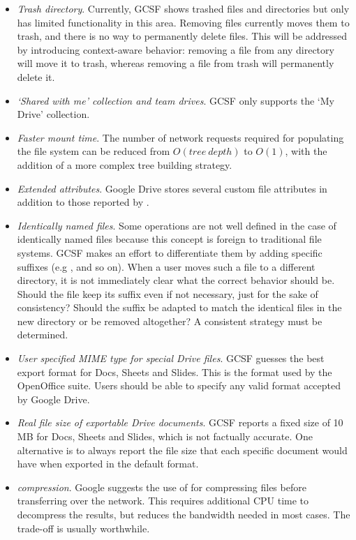\begin{itemize}
  \itemsep0em
  \item \emph{Trash directory}. Currently, GCSF shows trashed files and directories but only has limited functionality in this area. Removing files currently moves them to trash, and there is no way to permanently delete files. This will be addressed by introducing context-aware behavior: removing a file from any directory will move it to trash, whereas removing a file from trash will permanently delete it.
  \item \emph{`Shared with me' collection and team drives}. GCSF only supports the `My Drive' collection.
  \item \emph{Faster mount time}. The number of network requests required for populating the file system can be reduced from $ O(tree~depth) $ to $ O(1) $, with the addition of a more complex tree building strategy.
  \item \emph{Extended attributes}. Google Drive stores several custom file attributes in addition to those reported by .
  \item \emph{Identically named files}. Some operations are not well defined in the case of identically named files because this concept is foreign to traditional file systems. GCSF makes an effort to differentiate them by adding specific suffixes (e.g ,  and so on). When a user moves such a file to a different directory, it is not immediately clear what the correct behavior should be. Should the file keep its suffix even if not necessary, just for the sake of consistency? Should the suffix be adapted to match the identical files in the new directory or be removed altogether? A consistent strategy must be determined.
  \item \emph{User specified MIME type for special Drive files}. GCSF guesses the best export format for Docs, Sheets and Slides. This is the format used by the OpenOffice suite. Users should be able to specify any valid format accepted by Google Drive.
  \item \emph{Real file size of exportable Drive documents}. GCSF reports a fixed size of 10 MB for Docs, Sheets and Slides, which is not factually accurate. One alternative is to always report the file size that each specific document would have when exported in the default format.
  \item {} \emph{compression}. Google suggests the use of  for compressing files before transferring over the network. This requires additional CPU time to decompress the results, but reduces the bandwidth needed in most cases. The trade-off is usually worthwhile.

\end{itemize}
